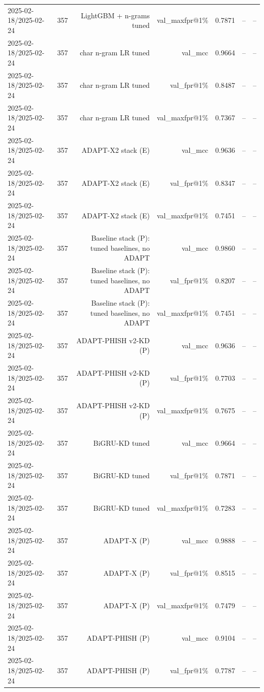\begin{table}[t]
\begin{tabular}{llrrrrr}
2025-02-18/2025-02-24 & 357 & LightGBM + n-grams tuned & val\_maxfpr@1\% & 0.7871 & -- & -- \\
2025-02-18/2025-02-24 & 357 & char n-gram LR tuned & val\_mcc & 0.9664 & -- & -- \\
2025-02-18/2025-02-24 & 357 & char n-gram LR tuned & val\_fpr@1\% & 0.8487 & -- & -- \\
2025-02-18/2025-02-24 & 357 & char n-gram LR tuned & val\_maxfpr@1\% & 0.7367 & -- & -- \\
2025-02-18/2025-02-24 & 357 & ADAPT-X2 stack (E) & val\_mcc & 0.9636 & -- & -- \\
2025-02-18/2025-02-24 & 357 & ADAPT-X2 stack (E) & val\_fpr@1\% & 0.8347 & -- & -- \\
2025-02-18/2025-02-24 & 357 & ADAPT-X2 stack (E) & val\_maxfpr@1\% & 0.7451 & -- & -- \\
2025-02-18/2025-02-24 & 357 & Baseline stack (P): tuned baselines, no ADAPT & val\_mcc & 0.9860 & -- & -- \\
2025-02-18/2025-02-24 & 357 & Baseline stack (P): tuned baselines, no ADAPT & val\_fpr@1\% & 0.8207 & -- & -- \\
2025-02-18/2025-02-24 & 357 & Baseline stack (P): tuned baselines, no ADAPT & val\_maxfpr@1\% & 0.7451 & -- & -- \\
2025-02-18/2025-02-24 & 357 & ADAPT-PHISH v2-KD (P) & val\_mcc & 0.9636 & -- & -- \\
2025-02-18/2025-02-24 & 357 & ADAPT-PHISH v2-KD (P) & val\_fpr@1\% & 0.7703 & -- & -- \\
2025-02-18/2025-02-24 & 357 & ADAPT-PHISH v2-KD (P) & val\_maxfpr@1\% & 0.7675 & -- & -- \\
2025-02-18/2025-02-24 & 357 & BiGRU-KD tuned & val\_mcc & 0.9664 & -- & -- \\
2025-02-18/2025-02-24 & 357 & BiGRU-KD tuned & val\_fpr@1\% & 0.7871 & -- & -- \\
2025-02-18/2025-02-24 & 357 & BiGRU-KD tuned & val\_maxfpr@1\% & 0.7283 & -- & -- \\
2025-02-18/2025-02-24 & 357 & ADAPT-X (P) & val\_mcc & 0.9888 & -- & -- \\
2025-02-18/2025-02-24 & 357 & ADAPT-X (P) & val\_fpr@1\% & 0.8515 & -- & -- \\
2025-02-18/2025-02-24 & 357 & ADAPT-X (P) & val\_maxfpr@1\% & 0.7479 & -- & -- \\
2025-02-18/2025-02-24 & 357 & ADAPT-PHISH (P) & val\_mcc & 0.9104 & -- & -- \\
2025-02-18/2025-02-24 & 357 & ADAPT-PHISH (P) & val\_fpr@1\% & 0.7787 & -- & -- \\

\end{tabular}
\end{table}
